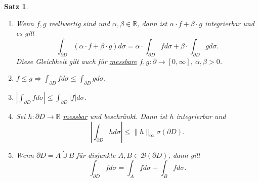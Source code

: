 \documentclass[a4paper]{report}
\newcommand{\R}{\mathbb{R}}
\newcommand{\Borel}{\mathcal{B}}
\newcommand{\dcup}{\dot{\cup}}
\newcommand{\jlabel}[1]{\label{j_#1}}
\newcommand{\jhyperref}[2]{\hyperref[j_#1]{#2}}
\newcommand{\jlink}[1]{\jhyperref{#1}{#1}}
\newcommand{\jabb}[3]{ #1: #2 \rightarrow #3 }
\theoremstyle{plain}
\newtheorem{satz}[thm]{Satz}
\theoremstyle{definition}
\begin{document}
{{{{\begin{satz}
\begin{enumerate}
        \item
            \jlabel{Satz 4.14c)}
            Wenn $f,g$ reellwertig sind und $\alpha,\beta \in \R$, dann ist $\alpha\cdot f + \beta \cdot g$ integrierbar und es gilt
            \[
                \int_{\partial D} (\alpha\cdot f + \beta\cdot g) d\sigma = \alpha\cdot \int_{\partial D} f d\sigma + \beta \cdot \int_{\partial D} g d\sigma.
            \]
            Diese Gleichheit gilt auch für \jhyperref{messbar}{messbare} $\jabb{f,g}{\partial}{[0,\infty]}$, $\alpha,\beta >0$.
        \item
            \jlabel{Satz 4.14d)}
            $f\le g \Rightarrow \int_{\partial D} f d\sigma \le \int_{\partial D} g d\sigma$.
        \item
            \jlabel{Satz 4.14e)}
            $\left | \int_{\partial D} f d\sigma \right | \le \int_{\partial D} |f|d\sigma$.
        \item
            \jlabel{Satz 4.14f)}
            Sei $\jabb{h}{\partial D}{\R}$ \jlink{messbar} und beschränkt. Dann ist $h$ integrierbar und
            \[
                \left | \int_{\partial D} h d\sigma \right | \le \lVert h \rVert_\infty \sigma(\partial D).
            \]

        \item
            \jlabel{Satz 4.14g)}
            Wenn $\partial D = A \dcup B$ für disjunkte $A,B \in \Borel(\partial D)$, dann gilt
            \[
                \int_{\partial D} f d\sigma = \int_A f d\sigma + \int_B f d\sigma.
            \]


\end{enumerate}
\end{satz}}}}}
\end{document}
